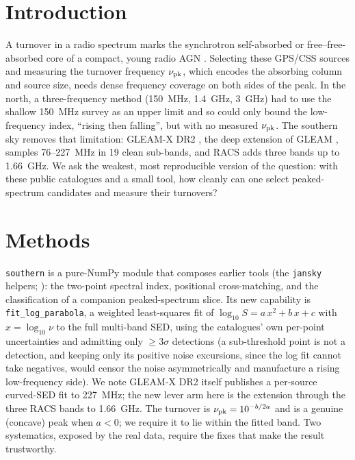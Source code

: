 \documentclass[twocolumn]{aastex631}
\newcommand{\code}[1]{\texttt{#1}}
\newcommand{\nupk}{\ensuremath{\nu_{\rm pk}}}
\begin{document}

\section{Introduction}
A turnover in a radio spectrum marks the synchrotron self-absorbed or free--free-absorbed core of a
compact, young radio AGN \citep{odea1998,odea2021}. Selecting these GPS/CSS sources and measuring the
turnover frequency \nupk, which encodes the absorbing column and source size, needs dense frequency
coverage on both sides of the peak. In the north, a three-frequency method (150~MHz, 1.4~GHz, 3~GHz)
had to use the shallow 150~MHz survey as an upper limit and so could only bound the low-frequency
index, ``rising then falling'', but with no measured \nupk. The southern sky removes that limitation:
GLEAM-X DR2 \citep{rossdr2}, the deep extension of GLEAM \citep{gleam2017}, samples 76--227~MHz in 19 clean
sub-bands, and RACS \citep{racs2020} adds three bands up to 1.66~GHz. We ask the weakest, most
reproducible version of the question: with these public catalogues and a small tool, how cleanly can
one select peaked-spectrum candidates and measure their turnovers?

\section{Methods}
\code{southern} is a pure-NumPy module that composes earlier tools (the \code{jansky} helpers;
\citealt{jansky}): the two-point spectral index, positional cross-matching, and the classification of
a companion peaked-spectrum slice. Its new capability is \code{fit\_log\_parabola}, a weighted
least-squares fit of $\log_{10}S = a\,x^2+b\,x+c$ with $x=\log_{10}\nu$ to the full multi-band SED,
using the catalogues' own per-point uncertainties and admitting only $\ge3\sigma$ detections
(a sub-threshold point is not a detection, and keeping only its positive noise excursions, since
the log fit cannot take negatives, would censor the noise asymmetrically and manufacture a rising
low-frequency side). We note GLEAM-X DR2 itself publishes a per-source curved-SED fit to
227~MHz; the new lever arm here is the extension through the three RACS bands to 1.66~GHz. The
turnover is $\nupk=10^{-b/2a}$ and is a genuine (concave) peak when $a<0$; we require it to lie
within the fitted band. Two systematics, exposed by the real data, require the fixes that make
the result trustworthy.
\end{document}
